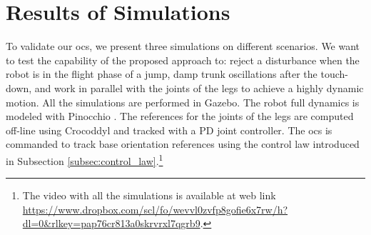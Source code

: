 \documentclass[letterpaper, 10 pt, conference]{ieeeconf}      %
\begin{document}
\section{Results of Simulations}
\label{sec:simulations}
To validate our \gls{ocs}, we present three simulations on different scenarios. We want to test the capability of the proposed approach to: 
reject a disturbance when the robot is in the flight phase of a jump, damp trunk oscillations after the touch-down, 
and work in parallel with the joints of the legs to achieve a highly dynamic motion. 
All the simulations are performed in Gazebo. The robot full dynamics is modeled with Pinocchio \cite{carpentier2019pinocchio}. The references for the joints of the legs are computed off-line using Crocoddyl \cite{mastalli2020crocoddyl} and tracked with a PD joint controller. The \gls{ocs} is commanded to 
track base orientation references using the control law introduced in Subsection \ref{subsec:control_law}.\footnote{The video with all the simulations is available at web link \url{https://www.dropbox.com/scl/fo/wevvl0zvfp8gofie6x7rw/h?dl=0&rlkey=pap76cr813a0skrvrxl7qgrb9}.}
\end{document}
